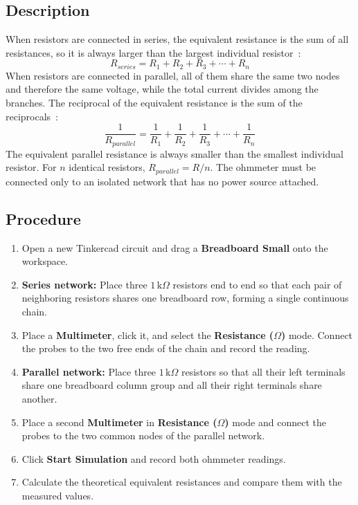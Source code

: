 \documentclass[11pt,a4paper]{article}
\begin{document}
\subsection{Description}
When resistors are connected in series, the equivalent resistance is the sum of all resistances, so it is always larger than the largest individual resistor~\cite{ref_boylestad}:
\[
R_{series} = R_1 + R_2 + R_3 + \cdots + R_n
\]
When resistors are connected in parallel, all of them share the same two nodes and therefore the same voltage, while the total current divides among the branches. The reciprocal of the equivalent resistance is the sum of the reciprocals~\cite{ref_floyd}:
\[
\frac{1}{R_{parallel}} = \frac{1}{R_1} + \frac{1}{R_2} + \frac{1}{R_3} + \cdots + \frac{1}{R_n}
\]
The equivalent parallel resistance is always smaller than the smallest individual resistor. For $n$ identical resistors, $R_{parallel} = R/n$. The ohmmeter must be connected only to an isolated network that has no power source attached.

\subsection{Procedure}
\begin{enumerate}
    \item Open a new Tinkercad circuit and drag a \textbf{Breadboard Small} onto the workspace.
    \item \textbf{Series network:} Place three $1\,\text{k}\Omega$ resistors end to end so that each pair of neighboring resistors shares one breadboard row, forming a single continuous chain.
    \item Place a \textbf{Multimeter}, click it, and select the \textbf{Resistance ($\Omega$)} mode. Connect the probes to the two free ends of the chain and record the reading.
    \item \textbf{Parallel network:} Place three $1\,\text{k}\Omega$ resistors so that all their left terminals share one breadboard column group and all their right terminals share another.
    \item Place a second \textbf{Multimeter} in \textbf{Resistance ($\Omega$)} mode and connect the probes to the two common nodes of the parallel network.
    \item Click \textbf{Start Simulation} and record both ohmmeter readings.
    \item Calculate the theoretical equivalent resistances and compare them with the measured values.
\end{enumerate}
\end{document}
